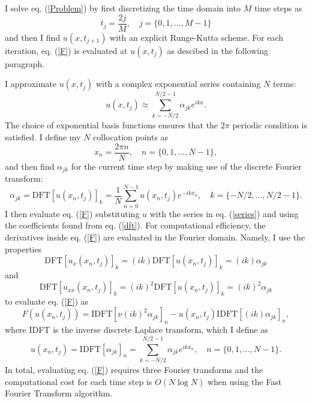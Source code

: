 \documentclass[12pt]{article}
\begin{document}
I solve eq. (\ref{Problem}) by first discretizing the time domain into
$M$ time steps as
\begin{equation}
  t_j = \frac{2j}{M}, \quad j=\{0,1,...,M-1\}
\end{equation} 
and then I find $u(x,t_{j+1})$ with an explicit Runge-Kutta scheme.
For each iteration, eq. (\ref{F}) is evaluated at $u(x,t_j)$ as
descibed in the following paragraph.  

I approximate $u(x,t_j)$ with a complex exponential series containing
$N$ terms:
\begin{equation}\label{series}
  u(x,t_j) \approx \sum_{k=-N/2}^{N/2-1}\alpha_{jk}e^{ikx}.
\end{equation}
The choice of exponential basis functions ensures that the $2\pi$
periodic condition is satisfied.  I define my $N$ collocation points
as
\begin{equation}
  x_n = \frac{2\pi n}{N}, \quad n = \{0,1,...,N-1\},
\end{equation}
and then find $\alpha_{jk}$ for the current time step by making use of the
discrete Fourier transform:
\begin{equation}\label{dft}
  \alpha_{jk} = \mathrm{DFT}[u(x_n,t_j)]_k =
  \frac{1}{N}\sum_{n=0}^{N-1}u(x_n,t_j)e^{-ikx_n}, \quad
  k=\{-N/2,...,N/2-1\}.
\end{equation}  
I then evaluate eq. (\ref{F}) substituting $u$ with the series in
eq. (\ref{series}) and using the coefficients found from
eq. (\ref{dft}). For computational efficiency, the derivatives inside
eq. (\ref{F}) are evaluated in the Fourier domain. Namely, I use the
properties
\begin{equation}
  \mathrm{DFT}[u_{x}(x_n,t_j)]_k = (ik)\mathrm{DFT}[u(x_n,t_j)]_k = (ik)\alpha_{jk}
\end{equation}   
and
\begin{equation}
  \mathrm{DFT}[u_{xx}(x_n,t_j)]_k = (ik)^2\mathrm{DFT}[u(x_n,t_j)]_k = (ik)^2\alpha_{jk}
\end{equation}   
to evaluate eq. (\ref{F}) as
\begin{equation}
  F(u(x_n,t_j)) = \mathrm{IDFT}[\nu(ik)^2\alpha_{jk}]_n -
  u(x_n,t_j)\mathrm{IDFT}[(ik)\alpha_{jk}]_n,
\end{equation}   
where IDFT is the inverse discrete Laplace transform, which I define as
\begin{equation}\label{ift}
  u(x_n,t_j) = \mathrm{IDFT}[\alpha_{jk}]_n =
  \sum_{k=-N/2}^{N/2-1}\alpha_{jk}e^{ikx_n}, \quad
  n=\{0,1,...,N-1\}.
\end{equation}   
In total, evaluating eq. (\ref{F}) requires three Fourier transforms
and the computational cost for each time step is $O(N\log N)$ when
using the Fast Fourier Transform algorithm.  
\end{document}
